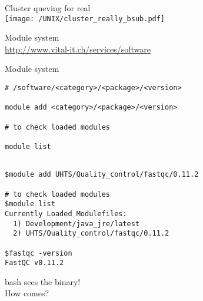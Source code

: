 \documentclass[xcolor=dvipsnames]{beamer}
\begin{document}
\begin{frame}
	\begin{center}	
		\Huge
		Cluster queving for real\\
		\vspace{1cm}
		\texttt{[image: /UNIX/cluster\_really\_bsub.pdf]}
	\end{center}
\end{frame}

\begin{frame}
	\begin{center}
		\Huge
		Module system\\
		\vspace{1cm}
		\Large
		\url{http://www.vital-it.ch/services/software}
	\end{center}
\end{frame}

\begin{frame}[fragile]
	\begin{center}
		\Huge
		Module system\\
		\vspace{1cm}
\large
\begin{verbatim}
# /software/<category>/<package>/<version>

module add <category>/<package>/<version>

# to check loaded modules

module list
\end{verbatim}
	\end{center}
\end{frame}

\begin{frame}[fragile]
\large
\begin{verbatim}

$module add UHTS/Quality_control/fastqc/0.11.2

# to check loaded modules
$module list
Currently Loaded Modulefiles:
  1) Development/java_jre/latest
  2) UHTS/Quality_control/fastqc/0.11.2
  
$fastqc -version
FastQC v0.11.2
\end{verbatim}
\end{frame}

\begin{frame}
	\begin{center}
		\Huge
		bash sees the binary!\\
		\vspace{1cm}
		\Large
		How comes?
	\end{center}
\end{frame}
\end{document}
